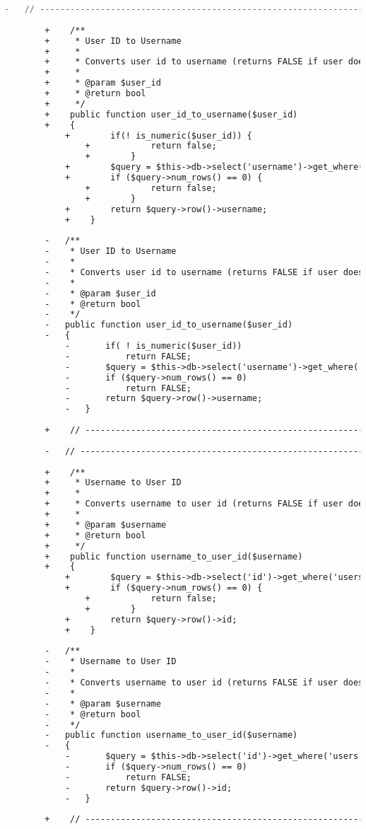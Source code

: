 \begin{lstlisting}[language=diff, caption=Perubahan pada kode User\_model.php]
		-	// ------------------------------------------------------------------------
		
		+    /**
		+     * User ID to Username
		+     *
		+     * Converts user id to username (returns FALSE if user does not exist)
		+     *
		+     * @param $user_id
		+     * @return bool
		+     */
		+    public function user_id_to_username($user_id)
		+    {
			+        if(! is_numeric($user_id)) {
				+            return false;
				+        }
			+        $query = $this->db->select('username')->get_where('users', array('id' => $user_id));
			+        if ($query->num_rows() == 0) {
				+            return false;
				+        }
			+        return $query->row()->username;
			+    }
		
		-	/**
		-	 * User ID to Username
		-	 *
		-	 * Converts user id to username (returns FALSE if user does not exist)
		-	 *
		-	 * @param $user_id
		-	 * @return bool
		-	 */
		-	public function user_id_to_username($user_id)
		-	{
			-		if( ! is_numeric($user_id))
			-			return FALSE;
			-		$query = $this->db->select('username')->get_where('users', array('id'=>$user_id));
			-		if ($query->num_rows() == 0)
			-			return FALSE;
			-		return $query->row()->username;
			-	}
		
		+    // ------------------------------------------------------------------------
		
		-	// ------------------------------------------------------------------------
		
		+    /**
		+     * Username to User ID
		+     *
		+     * Converts username to user id (returns FALSE if user does not exist)
		+     *
		+     * @param $username
		+     * @return bool
		+     */
		+    public function username_to_user_id($username)
		+    {
			+        $query = $this->db->select('id')->get_where('users', array('username' => $username));
			+        if ($query->num_rows() == 0) {
				+            return false;
				+        }
			+        return $query->row()->id;
			+    }
		
		-	/**
		-	 * Username to User ID
		-	 *
		-	 * Converts username to user id (returns FALSE if user does not exist)
		-	 *
		-	 * @param $username
		-	 * @return bool
		-	 */
		-	public function username_to_user_id($username)
		-	{
			-		$query = $this->db->select('id')->get_where('users', array('username'=>$username));
			-		if ($query->num_rows() == 0)
			-			return FALSE;
			-		return $query->row()->id;
			-	}
		
		+    // ------------------------------------------------------------------------
		

\end{lstlisting}
